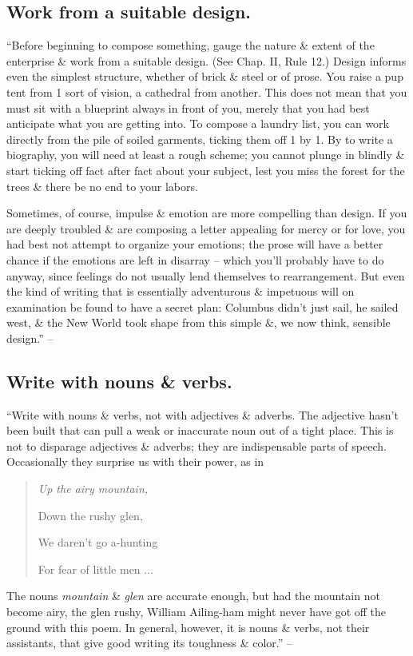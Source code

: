 \documentclass{article}
\numberwithin{equation}{section}
\begin{document}
\subsection{Work from a suitable design.}
``Before beginning to compose something, gauge the nature \& extent of the enterprise \& work from a suitable design. (See Chap. II, Rule 12.) Design informs even the simplest structure, whether of brick \& steel or of prose. You raise a pup tent from 1 sort of vision, a cathedral from another. This does not mean that you must sit with a blueprint always in front of you, merely that you had best anticipate what you are getting into. To compose a laundry list, you can work directly from the pile of soiled garments, ticking them off 1 by 1. By to write a biography, you will need at least a rough scheme; you cannot plunge in blindly \& start ticking off fact after fact about your subject, lest you miss the forest for the trees \& there be no end to your labors.

Sometimes, of course, impulse \& emotion are more compelling than design. If you are deeply troubled \& are composing a letter appealing for mercy or for love, you had best not attempt to organize your emotions; the prose will have a better chance if the emotions are left in disarray -- which you'll probably have to do anyway, since feelings do not usually lend themselves to rearrangement. But even the kind of writing that is essentially adventurous \& impetuous will on examination be found to have a secret plan: Columbus didn't just sail, he sailed west, \& the New World took shape from this simple \&, we now think, sensible design.'' -- \cite[p. 80]{Strunk_White2019}


\subsection{Write with nouns \& verbs.}
``Write with nouns \& verbs, not with adjectives \& adverbs. The adjective hasn't been built that can pull a weak or inaccurate noun out of a tight place. This is not to disparage adjectives \& adverbs; they are indispensable parts of speech. Occasionally they surprise us with their power, as in
\begin{quotation}\it
	Up the airy mountain,
	
	Down the rushy glen,
	
	We daren't go a-hunting
	
	For fear of little men $\ldots$
\end{quotation}
The nouns \textit{mountain} \& \textit{glen} are accurate enough, but had the mountain not become airy, the glen rushy, William Ailing-ham might never have got off the ground with this poem. In general, however, it is nouns \& verbs, not their assistants, that give good writing its toughness \& color.'' -- \cite[p. 81]{Strunk_White2019}
\end{document}
